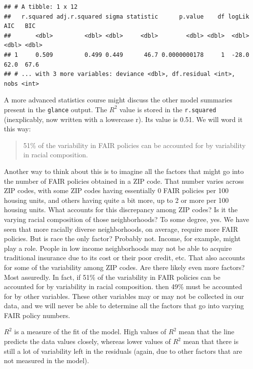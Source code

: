 \documentclass[
]{book}
\begin{document}
\begin{verbatim}
## # A tibble: 1 x 12
##   r.squared adj.r.squared sigma statistic      p.value    df logLik   AIC   BIC
##       <dbl>         <dbl> <dbl>     <dbl>        <dbl> <dbl>  <dbl> <dbl> <dbl>
## 1     0.509         0.499 0.449      46.7 0.0000000178     1  -28.0  62.0  67.6
## # ... with 3 more variables: deviance <dbl>, df.residual <int>, nobs <int>
\end{verbatim}

A more advanced statistics course might discuss the other model summaries present in the \texttt{glance} output. The \(R^{2}\) value is stored in the \texttt{r.squared} (inexplicably, now written with a lowercase r). Its value is 0.51. We will word it this way:

\begin{quote}
51\% of the variability in FAIR policies can be accounted for by variability in racial composition.
\end{quote}

Another way to think about this is to imagine all the factors that might go into the number of FAIR policies obtained in a ZIP code. That number varies across ZIP codes, with some ZIP codes having essentially 0 FAIR policies per 100 housing units, and others having quite a bit more, up to 2 or more per 100 housing units. What accounts for this discrepancy among ZIP codes? Is it the varying racial composition of those neighborhoods? To some degree, yes. We have seen that more racially diverse neighborhoods, on average, require more FAIR policies. But is race the only factor? Probably not. Income, for example, might play a role. People in low income neighborhoods may not be able to acquire traditional insurance due to its cost or their poor credit, etc. That also accounts for some of the variability among ZIP codes. Are there likely even more factors? Most assuredly. In fact, if 51\% of the variability in FAIR policies can be accounted for by variability in racial composition. then 49\% must be accounted for by other variables. These other variables may or may not be collected in our data, and we will never be able to determine all the factors that go into varying FAIR policy numbers.

\(R^2\) is a measure of the fit of the model. High values of \(R^2\) mean that the line predicts the data values closely, whereas lower values of \(R^2\) mean that there is still a lot of variability left in the residuals (again, due to other factors that are not measured in the model).
\end{document}
